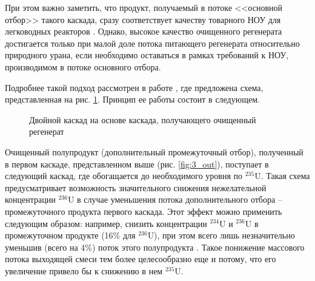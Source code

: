 При этом важно заметить, что продукт, получаемый в потоке <<основной отбор>> такого каскада, сразу соответствует качеству товарного НОУ для легководных реакторов \cite{palkinSeparationUraniumIsotopes2010}. Однако, высокое качество очищенного регенерата достигается только при малой доле потока питающего регенерата относительно природного урана, если необходимо оставаться в рамках требований к НОУ, производимом в потоке основного отбора.

Подробнее такой подход рассмотрен в работе \cite{palkinPurificationReprocessedUranium2016}, где предложена схема, представленная на рис. \ref{fig:int_double}. Принцип ее работы состоит в следующем.

\begin{figure}[ht]
  \caption{Двойной каскад на основе каскада, получающего очищенный регенерат}\label{fig:int_double}
\end{figure}

Очищенный полупродукт (дополнительный промежуточный отбор), полученный в первом каскаде, представленном выше (рис. \ref{fig:3_out}), поступает в следующий каскад, где обогащается до необходимого уровня по $^{235}$U. Такая схема предусматривает возможность значительного снижения нежелательной концентрации $^{236}$U в случае уменьшения потока дополнительного отбора -- промежуточного продукта первого каскада.
Этот эффект можно применить следующим образом: например, снизить концентрации  $^{234}$U и  $^{236}$U в промежуточном продукте (16\% для  $^{236}$U), при этом всего лишь незначительно уменьшив (всего на 4\%) поток этого полупродукта \cite{palkinPurificationReprocessedUranium2016}.
Такое понижение массового потока выходящей смеси тем более целесообразно еще и потому, что его увеличение привело бы к снижению в нем $^{235}$U.


